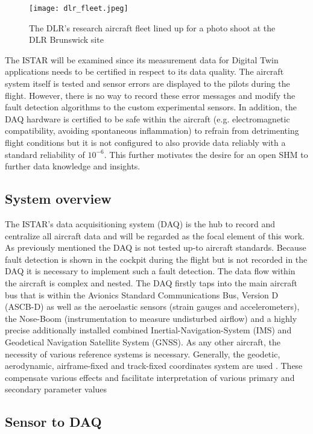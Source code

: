 \begin{figure}
    \centering
    \texttt{[image: dlr\_fleet.jpeg]}
    \caption{The DLR's research aircraft fleet \cite{dlr_dlr-fleet_2018} lined up for a photo shoot at the DLR Brunswick site}
    \label{fig:dlr_fleet}
\end{figure}

The ISTAR will be examined since its measurement data for Digital Twin applications needs to be certified in respect to its data quality. The aircraft system itself is tested and sensor errors are displayed to the pilots during the flight. However, there is no way to record these error messages and modify the fault detection algorithms to the custom experimental sensors. In addition, the DAQ hardware is certified to be safe within the aircraft (e.g. electromagnetic compatibility, avoiding spontaneous inflammation) to refrain from detrimenting flight conditions but it is not configured to also provide data reliably with a standard reliability of $10^{-6}$. This further motivates the desire for an open SHM to further data knowledge and insights.

\subsection{System overview}

The ISTAR's data acquisitioning system (DAQ) is the hub to record and centralize all aircraft data and will be regarded as the focal element of this work. As previously mentioned the DAQ is not tested up-to aircraft standards. Because fault detection is shown in the cockpit during the flight but is not recorded in the DAQ it is necessary to implement such a fault detection. The data flow within the aircraft is complex and nested. The DAQ firstly taps into the main aircraft bus that is within the Avionics Standard Communications Bus, Version D (ASCB-D) as well as the aeroelastic sensors (strain gauges and accelerometers), the Nose-Boom (instrumentation to measure undisturbed airflow) and a highly precise additionally installed combined Inertial-Navigation-System (IMS) and Geodetical Navigation Satellite System (GNSS). As any other aircraft, the necessity of various reference systems is necessary. Generally, the geodetic, aerodynamic, airframe-fixed and track-fixed coordinates system are used \cite{brockhaus_flugregelung_2011}. These compensate various effects and facilitate interpretation of various primary and secondary parameter values

\subsection{Sensor to DAQ}

